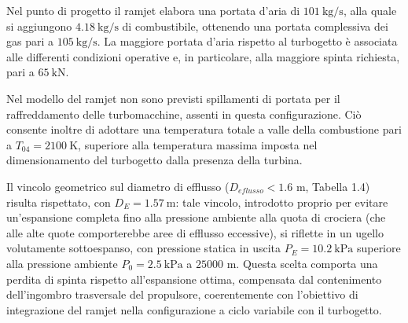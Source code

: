 Nel punto di progetto il ramjet elabora una portata d'aria di
$101\ \mathrm{kg/s}$, alla quale si aggiungono $4.18\ \mathrm{kg/s}$ di
combustibile, ottenendo una portata complessiva dei gas pari a
$105\ \mathrm{kg/s}$. La maggiore portata d'aria rispetto al turbogetto
è associata alle differenti condizioni operative e, in particolare, alla
maggiore spinta richiesta, pari a $65\ \mathrm{kN}$.

Nel modello del ramjet non sono previsti spillamenti di portata per il
raffreddamento delle turbomacchine, assenti in questa configurazione.
Ciò consente inoltre di adottare una temperatura totale a valle della
combustione pari a $T_{04}=2100\ \mathrm{K}$, superiore alla temperatura
massima imposta nel dimensionamento del turbogetto dalla presenza della
turbina.

Il vincolo geometrico sul diametro di efflusso ($D_{eflusso}<1.6$ m, Tabella 1.4) risulta rispettato, con $D_E=1.57\ \mathrm{m}$: tale vincolo, introdotto proprio per evitare un'espansione completa fino alla pressione ambiente alla quota di crociera (che alle alte quote comporterebbe aree di efflusso eccessive), si riflette in un ugello volutamente sottoespanso, con pressione statica in uscita $P_E=10.2\ \mathrm{kPa}$ superiore alla pressione ambiente $P_0=2.5\ \mathrm{kPa}$ a $25000$ m. Questa scelta comporta una perdita di spinta rispetto all'espansione ottima, compensata dal contenimento dell'ingombro trasversale del propulsore, coerentemente con l'obiettivo di integrazione del ramjet nella configurazione a ciclo variabile con il turbogetto.